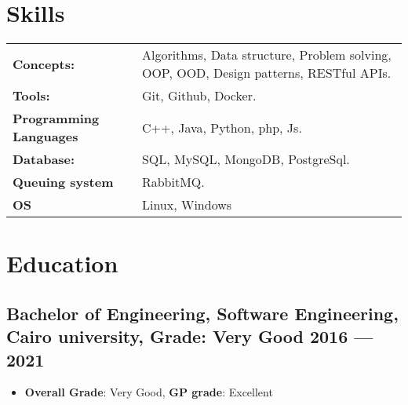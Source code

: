 \documentclass[a4,10pt]{article}
\newenvironment{zitemize}{
\begin{itemize}\itemsep0pt \parskip0pt \parsep1pt}
{\end{itemize}\vspace{-0.5cm}}
\newcommand{\hskills}[1]{
\textbf{\bfseries #1} }
\begin{document}
\section{Skills}
\begin{tabular}{p{14em} p{48em}}
\hskills{Concepts:} &  Algorithms, Data structure, Problem solving, OOP, OOD, Design
patterns, RESTful APIs. \\
\hskills{Tools:} & Git, Github, Docker.  \\
\hskills{Programming Languages} & C++, Java, Python, php, Js. \\
\hskills{Database:} & SQL, MySQL, MongoDB, PostgreSql. \\
\hskills{Queuing system} & RabbitMQ. \\
\hskills{OS} & Linux, Windows \\
\end{tabular}
\vspace{-0.2cm}

\section{Education }
\subsection*{Bachelor of Engineering, Software Engineering, {\normalsize \normalfont Cairo university, Grade: Very Good} \hfill 2016 --- 2021} 
\begin{zitemize}
    \item \textbf{Overall Grade}: Very Good, \textbf{GP grade}: Excellent
    
\end{zitemize}
\vspace{0.2cm}
\end{document}
